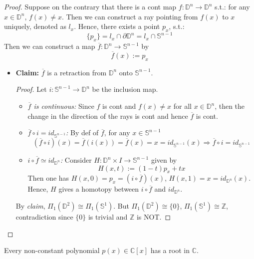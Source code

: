 \begin{proof}
    Suppose on the contrary that there is a cont map $f : \mathbb{D}^n \to \mathbb{D}^n$ s.t.: for any $x \in \mathbb{D}^n$, $f(x) \neq x$. Then we can construct a ray pointing from $f(x)$ to $x$ uniquely, denoted as $l_x$. Hence, there exists a point $p_x$, s.t.:
    $$\{p_x\} = l_x \cap \partial \mathbb{D}^n = l_x \cap \mathbb{S}^{n-1}$$
    Then we can construct a map $\overline{f}: \mathbb{D}^n \to \mathbb{S}^{n-1}$ by
    $$\overline{f} (x) := p_x$$
    \begin{itemize}
        \item \textbf{Claim:} $\overline{f}$ is a retraction from $\mathbb{D}^n$ onto $\mathbb{S}^{n-1}$.
        \begin{proof}
        Let $i: \mathbb{S}^{n-1} \to \mathbb{D}^n$ be the inclusion map.
            \begin{itemize}
                \item \textit{$\overline{f}$ is continuous:} Since $f$ is cont and $f(x) \neq x$ for all $x \in \mathbb{D}^n$, then the change in the direction of the rays is cont and hence $\overline{f}$ is cont.
                \item \textit{$\overline{f} \circ i = id_{\mathbb{S}^{n-1}}$:} By def of $\overline{f}$, for any $x \in \mathbb{S}^{n-1}$
                $$(\overline{f} \circ i) (x) = \overline{f}(i(x)) = \overline{f} (x) = x = id_{\mathbb{S}^{n-1}} (x) \Rightarrow \overline{f} \circ i = id_{\mathbb{S}^{n-1}}$$
                \item \textit{$i \circ \overline{f} \simeq id_{\mathbb{D}^n}$:} Consider $H: \mathbb{D}^n \times I \to \mathbb{S}^{n-1}$ given by
                $$H(x,t) := (1-t) p_x + tx$$
                Then one has $H(x,0) = p_x = (i \circ \overline{f} )(x)$, $H(x,1) = x = id_{\mathbb{D}^n}(x)$. Hence, $H$ gives a homotopy between $i \circ \overline{f}$ and $id_{\mathbb{D}^n}$.
            \end{itemize}
            By \textit{claim}, $\Pi_1 (\mathbb{D}^2) \cong \Pi_1 (\mathbb{S}^1)$. But $\Pi_1 (\mathbb{D}^2) \cong \{ 0\}$, $\Pi_1 (\mathbb{S}^1) \cong \mathbb{Z}$, contradiction since $\{0\}$ is trivial and $\mathbb{Z}$ is NOT.
        \end{proof}
    \end{itemize}
\end{proof}

\begin{theorem}
Every non-constant polynomial $p(x) \in \mathbb{C}[x]$ has a root in $\mathbb{C}$.
\end{theorem}


